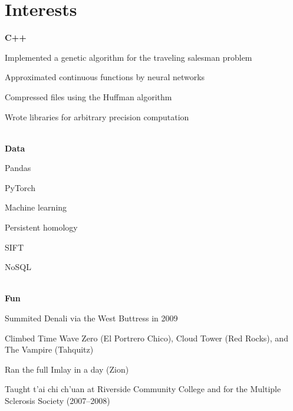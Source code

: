 \documentclass[11pt]{article}
\begin{document}
\section*{Interests}
\noindent\textbf{C++}
\begin{inparaitem}
\item Implemented a genetic algorithm for the traveling salesman problem
\item Approximated continuous functions by neural networks
\item Compressed files using the Huffman algorithm
\item Wrote libraries for arbitrary precision computation
\end{inparaitem}
\\
\noindent\textbf{Data}
\begin{inparaitem}
\item Pandas
\item PyTorch
\item Machine learning
\item Persistent homology
\item SIFT
\item NoSQL
\end{inparaitem}
\\
\noindent\textbf{Fun}
\begin{inparaitem}
\item Summited Denali via the West Buttress in 2009
\item Climbed Time Wave Zero (El Portrero Chico), Cloud Tower (Red Rocks), and The Vampire (Tahquitz)
\item Ran the full Imlay in a day (Zion)
\item Taught t'ai chi ch'uan at Riverside Community College and for the Multiple Sclerosis Society (2007--2008)
\end{inparaitem}
\end{document}
